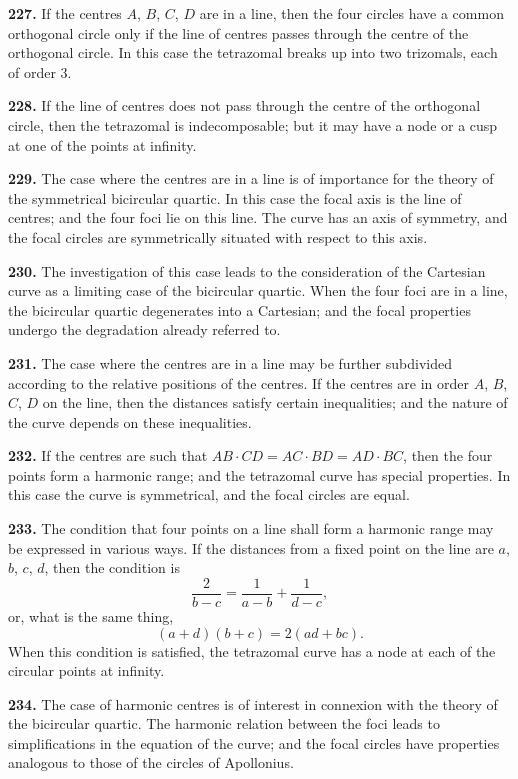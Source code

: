 \documentclass[12pt,a4paper]{article}
\theoremstyle{definition}
\begin{document}
\noindent\textbf{227.} If the centres $A$, $B$, $C$, $D$ are in a line, then the four circles have a common
orthogonal circle only if the line of centres passes through the centre of the orthogonal
circle. In this case the tetrazomal breaks up into two trizomals, each of order $3$.

\noindent\textbf{228.} If the line of centres does not pass through the centre of the orthogonal
circle, then the tetrazomal is indecomposable; but it may have a node or a cusp at
one of the points at infinity.

\noindent\textbf{229.} The case where the centres are in a line is of importance for the theory
of the symmetrical bicircular quartic. In this case the focal axis is the line of centres;
and the four foci lie on this line. The curve has an axis of symmetry, and the focal
circles are symmetrically situated with respect to this axis.

\noindent\textbf{230.} The investigation of this case leads to the consideration of the Cartesian
curve as a limiting case of the bicircular quartic. When the four foci are in a line,
the bicircular quartic degenerates into a Cartesian; and the focal properties undergo
the degradation already referred to.

\newpage
\noindent\textbf{231.} The case where the centres are in a line may be further subdivided
according to the relative positions of the centres. If the centres are in order $A$, $B$, $C$, $D$
on the line, then the distances satisfy certain inequalities; and the nature of the curve
depends on these inequalities.

\noindent\textbf{232.} If the centres are such that $AB \cdot CD = AC \cdot BD = AD \cdot BC$, then the
four points form a harmonic range; and the tetrazomal curve has special properties.
In this case the curve is symmetrical, and the focal circles are equal.

\noindent\textbf{233.} The condition that four points on a line shall form a harmonic range may
be expressed in various ways. If the distances from a fixed point on the line are
$a$, $b$, $c$, $d$, then the condition is
\[
\frac{2}{b - c} = \frac{1}{a - b} + \frac{1}{d - c},
\]
or, what is the same thing,
\[
(a + d)(b + c) = 2(ad + bc).
\]
When this condition is satisfied, the tetrazomal curve has a node at each of the
circular points at infinity.

\noindent\textbf{234.} The case of harmonic centres is of interest in connexion with the theory
of the bicircular quartic. The harmonic relation between the foci leads to simplifications
in the equation of the curve; and the focal circles have properties analogous to those
of the circles of Apollonius.
\end{document}
